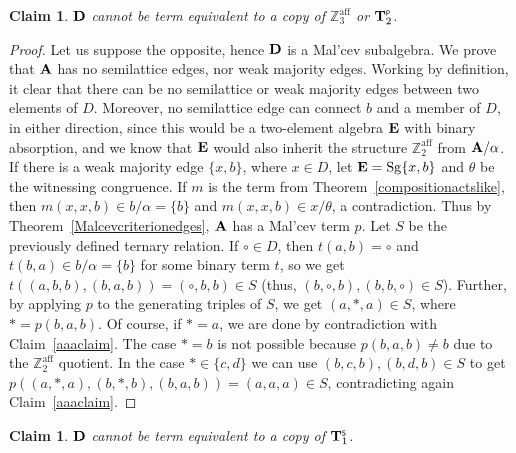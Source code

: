 \documentclass[11pt]{amsart}
\newcommand{\m}[1]{\mathbf{\uppercase{#1}}}
\theoremstyle{definition}
\theoremstyle{remark}
\theoremstyle{plain}
\newtheorem{claim}[thm]{Claim}
\begin{document}
\begin{claim}\label{Daff}
$\m d$ cannot be term equivalent to a copy of $\mathbb{Z}^{\mathrm{aff}}_3$ or $\m t_2^{\scriptscriptstyle{\mathsf{P}}}$.
\end{claim}
\begin{proof}
Let us suppose the opposite, hence $\m d$ is a Mal'cev subalgebra. We prove that $\m a$ has no semilattice edges, nor weak majority edges. Working by definition, it clear that there can be no semilattice or weak majority edges between two elements of $D$. Moreover, no semilattice edge can connect $b$ and a member of $D$, in either direction, since this would be a two-element algebra $\m e$ with binary absorption, and we know that $\m e$ would also inherit the structure $\mathbb{Z}^{\mathrm{aff}}_2$ from $\m a/\alpha$. If there is a weak majority edge $\{x,b\}$, where $x\in D$, let $\m e=\mathrm{Sg}\{x,b\}$ and $\theta$ be the witnessing congruence. If $m$ is the term from Theorem~\ref{compositionactslike}, then $m(x,x,b)\in b/\alpha=\{b\}$ and $m(x,x,b)\in x/\theta$, a contradiction. Thus by Theorem~\ref{Malcevcriterionedges}, $\m a$ has a Mal'cev term $p$. Let $S$ be the previously defined ternary relation. If $\circ\in D$, then $t(a,b)=\circ$ and $t(b,a)\in b/\alpha=\{b\}$ for some binary term $t$, so we get $t((a,b,b),(b,a,b))=(\circ,b,b)\in S$ (thus, $(b,\circ,b),(b,b,\circ)\in S$).  Further, by applying $p$ to the generating triples of $S$, we get $(a,\ast,a)\in S$, where $\ast=p(b,a,b)$. Of course, if $\ast=a$, we are done by contradiction with Claim~\ref{aaaclaim}. The case $\ast=b$ is not possible because $p(b,a,b)\neq b$ due to the $\mathbb{Z}^{\mathrm{aff}}_2$ quotient. In the case $\ast\in\{c,d\}$ we can use $(b,c,b),(b,d,b)\in S$ to get $p((a,\ast,a),(b,\ast,b),(b,a,b))=(a,a,a)\in S$, contradicting again Claim~\ref{aaaclaim}.
\end{proof}

\begin{claim}
$\m d$ cannot be term equivalent to a copy of $\m t_1^{\scriptscriptstyle{\mathsf{S}}}$.
\end{claim}
\end{document}
